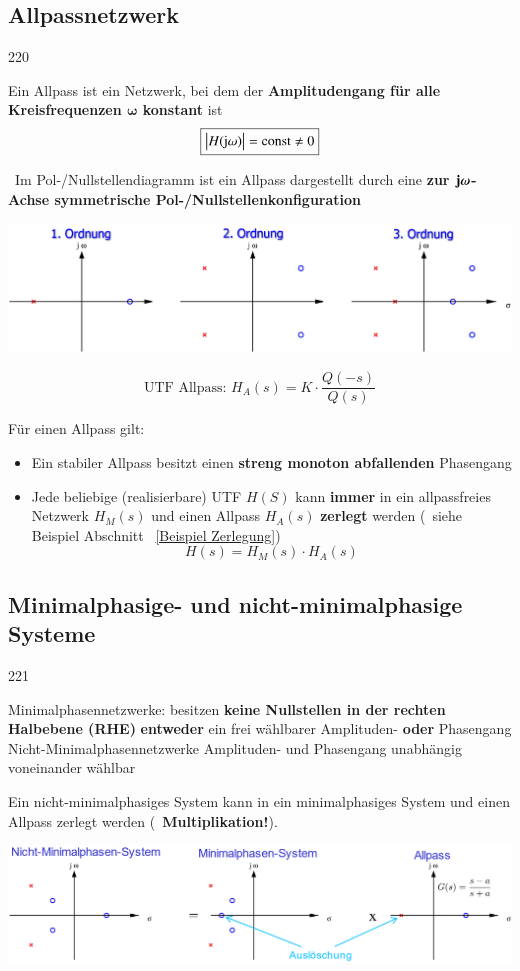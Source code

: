 \subsection{Allpassnetzwerk}{220}

Ein Allpass ist ein Netzwerk, bei dem der \textbf{Amplitudengang für alle Kreisfrequenzen $\bm{\omega}$ konstant} ist
$$ \boxed{\left|H(\mathrm{j} \omega)\right| = \mathrm{const} \neq 0}$$

\textrightarrow\ Im Pol-/Nullstellendiagramm ist ein Allpass dargestellt durch eine 
\textbf{zur $\bm{\mathrm{j} \omega}$-Achse symmetrische Pol-/Nullstellenkonfiguration}

\includegraphics[width=\columnwidth]{images/allpass.png}

$$ \boxed{ \text{UTF Allpass: } H_A(s) = K \cdot \frac{Q(-s)}{Q(s)} } $$

Für einen Allpass gilt:
\begin{itemize}
    \item Ein stabiler Allpass besitzt einen \textbf{streng monoton abfallenden} Phasengang
    \item Jede beliebige (realisierbare) UTF $H(S)$ kann \textbf{immer} in ein allpassfreies Netzwerk $H_M(s)$ und einen Allpass $H_A(s)$
        \textbf{zerlegt} werden (\textrightarrow\ siehe Beispiel Abschnitt ~\ref{Beispiel Zerlegung})
        $$ \boxed{ H(s) = H_M(s) \cdot H_A(s) }$$
\end{itemize}


\subsection{Minimalphasige- und nicht-minimalphasige Systeme}{221}

\begin{outline}
    \1 Minimalphasennetzwerke: 
        \2 besitzen \textbf{keine Nullstellen in der rechten Halbebene (RHE)}
        \2 \textbf{entweder} ein frei wählbarer Amplituden- \textbf{oder} Phasengang
    \1 Nicht-Minimalphasennetzwerke
        \2 Amplituden- und Phasengang unabhängig voneinander wählbar
\end{outline}


\label{Beispiel Zerlegung}

Ein nicht-minimalphasiges System kann in ein minimalphasiges System und einen Allpass zerlegt werden
(\textrightarrow\ \textbf{Multiplikation!}). 

\includegraphics[width=\columnwidth]{images/beispiel_minimalphasensystem.png}



